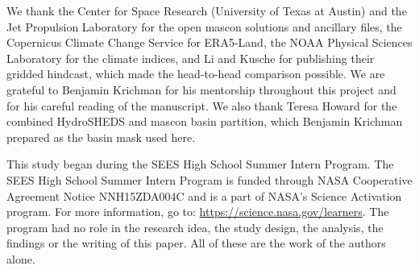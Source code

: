 \documentclass[hess, manuscript]{copernicus}
\begin{document}

\begin{acknowledgements}
We thank the Center for Space Research (University of Texas at
Austin) and the Jet Propulsion Laboratory for the open mascon solutions
and ancillary files, the Copernicus Climate Change Service for ERA5-Land,
the NOAA Physical Sciences Laboratory for the climate indices, and Li and Kusche for publishing their
gridded hindcast, which made the head-to-head comparison possible. We are
grateful to Benjamin Krichman for his mentorship throughout this project
and for his careful reading of the manuscript. We also thank Teresa Howard
for the combined HydroSHEDS and mascon basin partition, which Benjamin
Krichman prepared as the basin mask used here.

This study began during the SEES High School Summer Intern Program. The
SEES High School Summer Intern Program is funded through NASA Cooperative
Agreement Notice NNH15ZDA004C and is a part of NASA's Science Activation
program. For more information, go to:
\url{https://science.nasa.gov/learners}. The program had no role in the
research idea, the study design, the analysis, the findings or the writing
of this paper. All of these are the work of the authors alone.
\end{acknowledgements}




\end{document}
